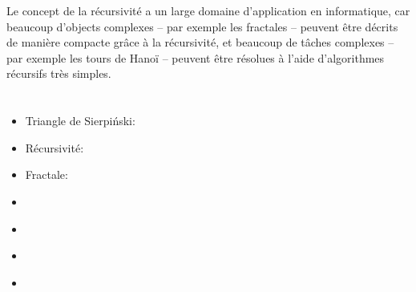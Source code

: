 {{Le concept de la récursivité a un large domaine d’application en informatique, car beaucoup d’objects complexes – par exemple les fractales – peuvent être décrits de manière compacte grâce à la récursivité, et beaucoup de tâches complexes – par exemple les tours de Hanoï – peuvent être résolues à l’aide d’algorithmes récursifs très simples.



\section*{\BrochureWebsitesAndKeywords}
{\raggedright
\begin{itemize}
  \item Triangle de Sierpiński: \href{https://fr.wikipedia.org/wiki/Triangle_de_Sierpi\%C5\%84ski}{}
  \item Récursivité: \href{https://fr.wikipedia.org/wiki/R\%C3\%A9cursivit\%C3\%A9}{}
  \item Fractale: \href{https://fr.wikipedia.org/wiki/Fractale}{}
  \item \href{https://fr.wikipedia.org/wiki/Wac\%C5\%82aw_Sierpi\%C5\%84ski}{}
  \item \href{https://fr.wikipedia.org/wiki/Tours_de_Hano\%C3\%AF\#Solution_r\%C3\%A9cursive}{}
  \item \href{https://fr.wikipedia.org/wiki/Flocon_de_Koch}{}
  \item \href{https://fr.wikipedia.org/wiki/Ensemble_de_Mandelbrot}{}
\end{itemize}


}

}{}

\def\AuthorDatzkoC{} %
\def\AuthorJungU{} %
\def\AuthorMoonK{} %
\def\AuthorDatzkoS{} %
\def\AuthorBarotM{} %
\def\AuthorFreiF{} %
\def\AuthorPelletE{} %

\newpage}{}
